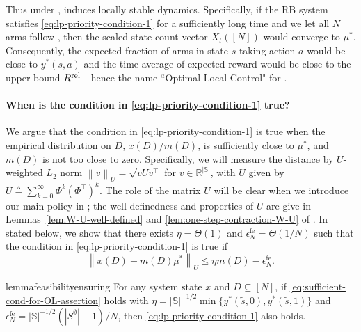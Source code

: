 \documentclass[11pt,letterpaper]{article}
\theoremstyle{plain}
\theoremstyle{definition}
\theoremstyle{remark}
\newcommand{\norm}[1]{\left\lVert#1\right\rVert}
\newcommand{\R}{\mathbb{R}}
\newcommand{\sspa}{\mathbb{S}}
\newcommand{\rel}{\textup{rel}} %
\newcommand{\ravg}{R}
\newcommand{\rrel}{\ravg^\rel}
\newcommand{\sempty}{S^{\emptyset}}
\newcommand{\statdist}{\mu^*}
\newcommand{\umat}{U}
\newcommand{\errfe}{\epsilon_N^{\text{fe}}}
\newcommand{\sneu}{\tilde{s}}
\begin{document}
Thus under ,   induces locally stable dynamics. Specifically, if the RB system satisfies \eqref{eq:lp-priority-condition-1} for a sufficiently long time and we let all $N$ arms follow , then the scaled state-count vector $X_t([N])$ would converge to $\statdist$. Consequently, the expected fraction of arms in state $s$ taking action $a$ would be close to $y^*(s,a)$ and the time-average of expected reward would be close to the upper bound $\rrel$---hence the name ``Optimal Local Control" for .





\paragraph{When is the condition in \eqref{eq:lp-priority-condition-1} true?}


We argue that the condition in \eqref{eq:lp-priority-condition-1} is true when the empirical distribution on $D$, $x(D) / m(D)$, is sufficiently close to $\statdist$, and $m(D)$ is not too close to zero. 
Specifically, we will measure the distance by $U$-weighted $L_2$ norm $\norm{v}_\umat = \sqrt{v \umat v^\top}$ for $v\in \R^{|\sspa|}$, with $U$ given by $\umat \triangleq \sum_{k=0}^\infty \Phi^k (\Phi^\top)^k$. The role of the matrix $\umat$ will be clear when we introduce our main policy in ; the well-definedness and properties of $\umat$ are give in Lemmas~\ref{lem:W-U-well-defined} and \ref{lem:one-step-contraction-W-U} of . 
In  stated below, we show that there exists $\eta = \Theta(1)$ and $\errfe = \Theta(1/N)$ such that the condition in \eqref{eq:lp-priority-condition-1} is true if 
\begin{equation}\label{eq:sufficient-cond-for-OL-assertion}
  \norm{x(D) - m(D) \statdist}_{\umat} \leq \eta m(D) - \errfe. 
\end{equation}

\begin{restatable}{lemma}{feasibilityensuring}\label{lem:feasibility-ensuring}
    For any system state $x$ and $D\subseteq [N]$, if \eqref{eq:sufficient-cond-for-OL-assertion} holds with $\eta = |\sspa|^{-1/2}\min\{y^*(\sneu, 0), y^*(\sneu, 1)\}$ and $\errfe = |\sspa|^{-1/2}(|\sempty|+1)/N$, then \eqref{eq:lp-priority-condition-1} also holds. 
\end{restatable}
\end{document}
